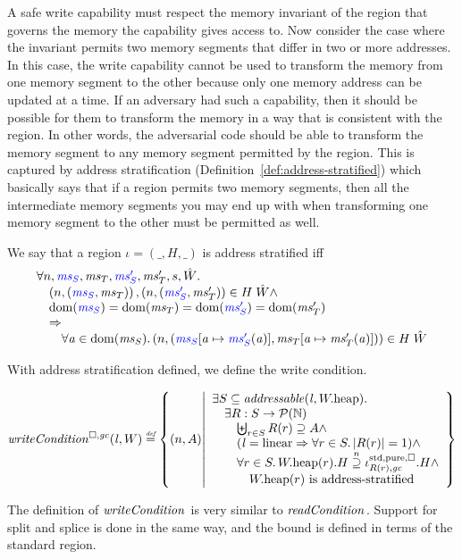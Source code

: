 \begin{jversion}
A safe write capability must respect the memory invariant of the region that governs the memory the capability gives access to.
Now consider the case where the invariant permits two memory segments that differ in two or more addresses.
In this case, the write capability cannot be used to transform the memory from one memory segment to the other because only one memory address can be updated at a time.
If an adversary had such a capability, then it should be possible for them to transform the memory in a way that is consistent with the region.
In other words, the adversarial code should be able to transform the memory segment to any memory segment permitted by the region.
This is captured by address stratification (Definition~\ref{def:address-stratified}) which basically says that if a region permits two memory segments, then all the intermediate memory segments you may end up with when transforming one memory segment to the other must be permitted as well.
\begin{definition}
  \label{def:address-stratified}
  We say that a region $\iota = (\_,H,\_)$ is address stratified iff
  \[
    \begin{array}{l}
      \forall n, \src{\ms_S},\ms_T,\src{\ms_S'},\ms_T',s,\hat{W}\ldotp \\
      \quad \npair{\stpair{\ms}{\ms}}, \npair{\stpair[.]{\ms_S'}{\ms_T'}} \in H \; \hat{W} \wedge \\
      \quad \dom(\src{\ms_S}) = \dom(\ms_T) = \dom(\src{\ms_S'}) = \dom(\ms_T') \\
      \quad \Rightarrow \\
      \qquad \forall \aaddr \in \dom(\ms_S) \ldotp \npair{(\src{\ms_S}\update{\aaddr}{\src{\ms_S'}(\aaddr)},\ms_T\update{\aaddr}{\ms_T'(\aaddr)})} \in H \; \hat{W}
    \end{array}
  \]
\end{definition}
With address stratification defined, we define the write condition.
\begin{definition}
\[
  \writeCond{\lin,W} \defeq \left\{ \npair{A} \middle| 
    \begin{array}{l}
      \exists S \subseteq \addressable{\lin, \pwheap} \ldotp \\
      \quad \exists R : S \fun \powerset{\nats}\\
      \qquad \biguplus_{r\in S} R(r) \supseteq A \wedge\\
      \qquad (\lin = \linear \Rightarrow \forall r \in S \ldotp |R(r)|  = 1) \wedge\\
      \qquad \forall r \in S \ldotp \pwheap(r).H \nsupeq \stdreg{R(r),\gc}{\pure}.H \wedge\\
      \qquad \quad \pwheap(r) \text{ is address-stratified}
    \end{array}
  \right\}
\]
\end{definition}
The definition of $\writeCond[]{}$ is very similar to $\readCond[]{}$.
Support for split and splice is done in the same way, and the bound is defined in terms of the standard region.


\end{jversion}
